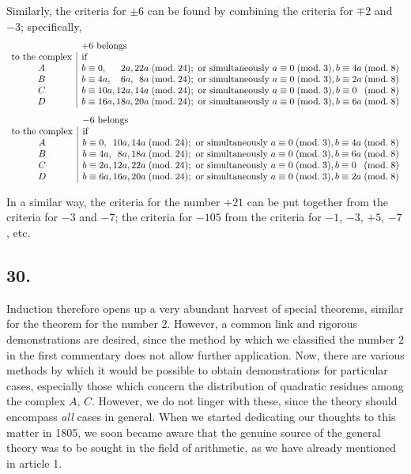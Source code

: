 \documentclass[twoside,12pt]{memoir}
\renewcommand{\pmod}[1]{\;(\textrm{mod.}\;#1)}
\begin{document}
Similarly, the criteria for \(\pm 6\) can be found by combining the criteria for \(\mp 2\) and \(-3\); specifically,
\[\begin{array}{c|l}
\multicolumn{1}{c}{}&\multicolumn{1}{l}{+6\text{ belongs}}\\
\text{to the complex}&\text{if}\\
A & b \equiv 0, \phantom{00a}2a, 22a \pmod{24}; \text{ or simultaneously } a \equiv 0 \pmod{3}, b \equiv 4a \pmod{8} \\
B & b \equiv 4a, \phantom{00}6a, \phantom{0}8a \pmod{24}; \text{ or simultaneously } a \equiv 0 \pmod{3}, b \equiv 2a \pmod{8} \\
C & b \equiv 10a, 12a, 14a \pmod{24}; \text{ or simultaneously } a \equiv 0 \pmod{3}, b \equiv 0\phantom{a} \pmod{8} \\
D & b \equiv 16a, 18a, 20a \pmod{24}; \text{ or simultaneously } a \equiv 0 \pmod{3}, b \equiv 6a \pmod{8}
\end{array}\]
\[\begin{array}{c|l}
\multicolumn{1}{c}{}&\multicolumn{1}{l}{-6\text{ belongs}}\\
\text{to the complex}&\text{if}\\
A & b \equiv 0,\phantom{a} 10a, 14a \pmod{24}; \text{ or simultaneously } a \equiv 0 \pmod{3}, b \equiv 4a \pmod{8} \\
B & b \equiv 4a, \phantom{0}8a, 18a \pmod{24}; \text{ or simultaneously } a \equiv 0 \pmod{3}, b \equiv 6a \pmod{8} \\
C & b \equiv 2a, 12a, 22a \pmod{24}; \text{ or simultaneously } a \equiv 0 \pmod{3}, b \equiv 0\phantom{a} \pmod{8} \\
D & b \equiv 6a, 16a, 20a \pmod{24}; \text{ or simultaneously } a \equiv 0 \pmod{3}, b \equiv 2a \pmod{8}
\end{array}\]

In a similar way, the criteria for the number \(+21\) can be put together from the criteria for \(-3\) and \(-7\); the criteria for \(-105\) from the criteria for \(-1\), \(-3\), \(+5\), \(-7\), etc{.}
%

\subsection*{30.}

Induction therefore opens up a very abundant harvest of special theorems, similar for the theorem for the number \(2\).  However, a common link and rigorous demonstrations are desired, since the method by which we classified the number \(2\) in the first commentary does not allow further application. Now, there are various methods by which it would be possible to obtain demonstrations for particular cases, especially those which concern the distribution of quadratic residues among the complex \(A\), \(C\). However, we do not linger with these, since the theory should encompass \textit{all} cases in general. When we started dedicating our thoughts to this matter in 1805, we soon became aware that the genuine source of the general theory was to be sought in the field of arithmetic, as we have already mentioned in article 1.
\end{document}
